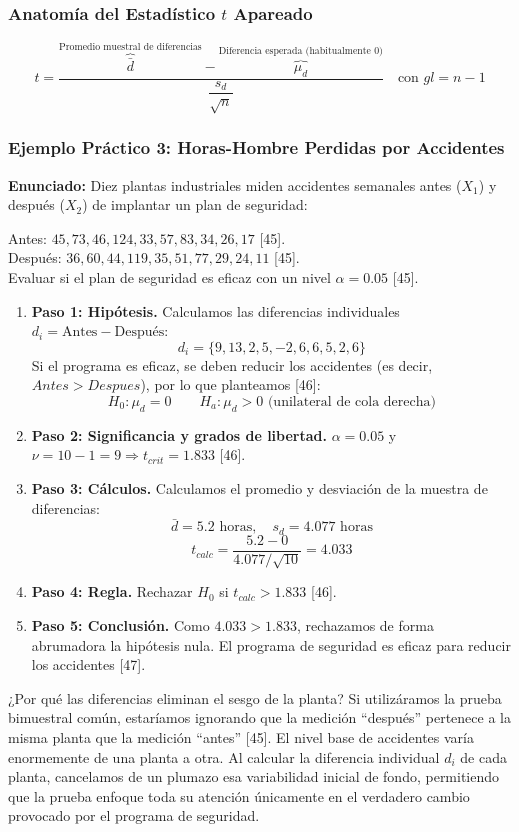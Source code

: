 \documentclass{article}
\begin{document}
\subsubsection*{Anatomía del Estadístico $t$ Apareado}
\[
t = \frac{ \overbrace{\bar{d}}^{\text{Promedio muestral de diferencias}} - \overbrace{\mu_d}^{\text{Diferencia esperada (habitualmente 0)}} }{ \dfrac{s_d}{\sqrt{n}} } \quad \text{con } gl = n - 1
\]

\subsubsection*{Ejemplo Práctico 3: Horas-Hombre Perdidas por Accidentes}
\textbf{Enunciado:} Diez plantas industriales miden accidentes semanales antes ($X_1$) y después ($X_2$) de implantar un plan de seguridad:

Antes: $45, 73, 46, 124, 33, 57, 83, 34, 26, 17$ [45].\\
Después: $36, 60, 44, 119, 35, 51, 77, 29, 24, 11$ [45].\\
Evaluar si el plan de seguridad es eficaz con un nivel $\alpha = 0.05$ [45].

\begin{enumerate}
    \item \textbf{Paso 1: Hipótesis.} Calculamos las diferencias individuales $d_i = \text{Antes} - \text{Después}$:
    \[ d_i = \{9, 13, 2, 5, -2, 6, 6, 5, 2, 6\} \]
    Si el programa es eficaz, se deben reducir los accidentes (es decir, $Antes > Despues$), por lo que planteamos [46]:
    \[ H_0: \mu_d = 0 \qquad H_a: \mu_d > 0 \text{ (unilateral de cola derecha)} \]
    \item \textbf{Paso 2: Significancia y grados de libertad.} $\alpha = 0.05$ y $\nu = 10 - 1 = 9 \Rightarrow t_{crit} = 1.833$ [46].
    \item \textbf{Paso 3: Cálculos.} Calculamos el promedio y desviación de la muestra de diferencias:
    \[ \bar{d} = 5.2 \text{ horas}, \quad s_d = 4.077 \text{ horas} \]
    \[ t_{calc} = \frac{5.2 - 0}{4.077/\sqrt{10}} = 4.033 \]
    \item \textbf{Paso 4: Regla.} Rechazar $H_0$ si $t_{calc} > 1.833$ [46].
    \item \textbf{Paso 5: Conclusión.} Como $4.033 > 1.833$, rechazamos de forma abrumadora la hipótesis nula. El programa de seguridad es eficaz para reducir los accidentes [47].
\end{enumerate}

\begin{didactico}{¿Por qué las diferencias eliminan el sesgo de la planta?}
Si utilizáramos la prueba bimuestral común, estaríamos ignorando que la medición ``después'' pertenece a la misma planta que la medición ``antes'' [45]. El nivel base de accidentes varía enormemente de una planta a otra. Al calcular la diferencia individual $d_i$ de cada planta, cancelamos de un plumazo esa variabilidad inicial de fondo, permitiendo que la prueba enfoque toda su atención únicamente en el verdadero cambio provocado por el programa de seguridad.
\end{didactico}
\end{document}
